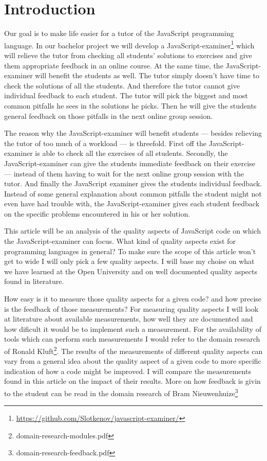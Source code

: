 \section{Introduction} 

Our goal is to make life easier for a tutor
of the JavaScript programming language.
In our bachelor project we will develop a
JavaScript-examiner\footnote{\url{https://github.com/Slotkenov/javascript-examiner/}}
which will relieve the tutor from checking all students' solutions to exercises
and give them appropriate feedback in an online course. At the same time, the
JavaScript-examiner will benefit the students as well. The tutor simply doesn't
have time to check the solutions of all the students. And therefore the tutor
cannot give individual feedback to each student. The tutor will pick the
biggest and most common pitfalls he sees in the solutions he picks. Then he
will give the students general feedback on those pitfalls in the next online
group session.

The reason why the JavaScript-examiner will benefit students --- besides
relieving the tutor of too much of a workload --- is threefold.  First off
the JavaScript-examiner is able to check all the exercises of all
students. Secondly, the JavaScript-examiner can give the students immediate
feedback on their exercise --- instead of them having to wait for the next
online group session with the tutor. And finally the JavaScript examiner
gives the students individual feedback. Instead of some general explanation
about common pitfalls the student might not even have had trouble with, the
JavaScript-examiner gives each student feedback on the specific problems
encountered in his or her solution.

This article will be an analysis of the quality aspects of JavaScript code on
which the JavaScript-examiner can focus.
What kind of quality aspects exist for programming languages in general?
To make sure the scope of this article won't get to wide
I will only pick a few quality aspects.
I will base my choise on what we have learned at the Open University
and on well documented quality aspects found in literature.

How easy is it to measure those quality aspects for a given code?
and how precise is the feedback of those measurements?
For measuring quality aspects
I will look at literature about available measurements,
how well they are documented
and how dificult it would be to implement such a measurement.
For the availability of tools which can perform such measurements
I would refer to the domain research of
Ronald Kluft\footnote{domain-research-modules.pdf}.
The results of the measurements of different quality aspects can vary from
a general idea about the quality aspect of a given code
to more specific indication of how a code might be improved.
I will compare the measurements found in this article
on the impact of their results.
More on how feedback is givin to the student
can be read in the domain research of
Bram Nieuwenhuize\footnote{domain-research-feedback.pdf}

